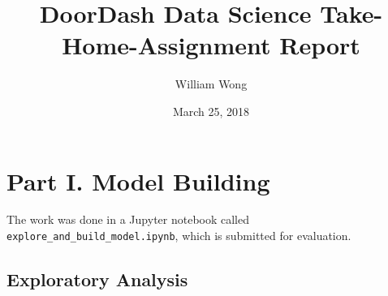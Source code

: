\documentclass[12pt]{article}
\begin{document}
\title{DoorDash Data Science Take-Home-Assignment Report}

\author{William Wong}
\date{March 25, 2018}

\maketitle


\section{Part I. Model Building}

The work was done in a Jupyter notebook called \texttt{explore\_and\_build\_model.ipynb},
which is submitted for evaluation.

\subsection{Exploratory Analysis}
\end{document}
